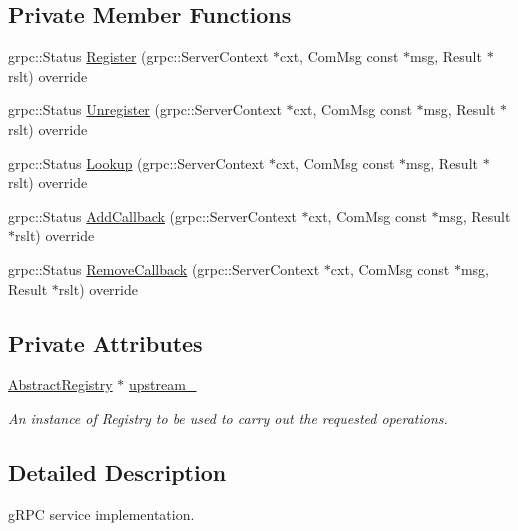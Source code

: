 \subsection*{Private Member Functions}
\begin{DoxyCompactItemize}
\item 
grpc\+::\+Status \hyperlink{classregistry_1_1ComService_aae8b56b86316397140c4f1cc4824410a}{Register} (grpc\+::\+Server\+Context $\ast$cxt, Com\+Msg const $\ast$msg, Result $\ast$rslt) override
\item 
grpc\+::\+Status \hyperlink{classregistry_1_1ComService_a6a64c38b8adf4443f387af7ed786245c}{Unregister} (grpc\+::\+Server\+Context $\ast$cxt, Com\+Msg const $\ast$msg, Result $\ast$rslt) override
\item 
grpc\+::\+Status \hyperlink{classregistry_1_1ComService_a06ba4b402944f87dbce6c2ce37d8c279}{Lookup} (grpc\+::\+Server\+Context $\ast$cxt, Com\+Msg const $\ast$msg, Result $\ast$rslt) override
\item 
grpc\+::\+Status \hyperlink{classregistry_1_1ComService_aebee320ae37a1a8ea31792ba1e8e7ad6}{Add\+Callback} (grpc\+::\+Server\+Context $\ast$cxt, Com\+Msg const $\ast$msg, Result $\ast$rslt) override
\item 
grpc\+::\+Status \hyperlink{classregistry_1_1ComService_a702848d7aad6839ba216862478c00d25}{Remove\+Callback} (grpc\+::\+Server\+Context $\ast$cxt, Com\+Msg const $\ast$msg, Result $\ast$rslt) override
\end{DoxyCompactItemize}
\subsection*{Private Attributes}
\begin{DoxyCompactItemize}
\item 
\hyperlink{classregistry_1_1AbstractRegistry}{Abstract\+Registry} $\ast$ \hyperlink{classregistry_1_1ComService_a308106b15416761e61709d608f10d726}{upstream\+\_\+}
\begin{DoxyCompactList}\small\item\em An instance of Registry to be used to carry out the requested operations. \end{DoxyCompactList}\end{DoxyCompactItemize}


\subsection{Detailed Description}
g\+R\+PC service implementation. 

